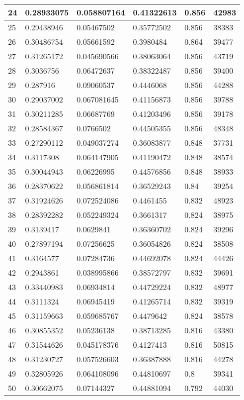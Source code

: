 \begin{longtable}{|l|l|l|l|l|l|}
24 & 0.28933075 & 0.058807164 & 0.41322613 & 0.856 & 42983 \\ \hline 
25 & 0.29438946 & 0.05467502 & 0.35772502 & 0.856 & 38383 \\ \hline 
26 & 0.30486754 & 0.05661592 & 0.3980484 & 0.864 & 39477 \\ \hline 
27 & 0.31265172 & 0.045690566 & 0.38063064 & 0.856 & 43719 \\ \hline 
28 & 0.3036756 & 0.06472637 & 0.38322487 & 0.856 & 39400 \\ \hline 
29 & 0.287916 & 0.09060537 & 0.4446068 & 0.856 & 44288 \\ \hline 
30 & 0.29037002 & 0.067081645 & 0.41156873 & 0.856 & 39788 \\ \hline 
31 & 0.30211285 & 0.06687769 & 0.41203496 & 0.856 & 39178 \\ \hline 
32 & 0.28584367 & 0.0766502 & 0.44505355 & 0.856 & 48348 \\ \hline 
33 & 0.27290112 & 0.049037274 & 0.36083877 & 0.848 & 37731 \\ \hline 
34 & 0.3117308 & 0.064147905 & 0.41190472 & 0.848 & 38574 \\ \hline 
35 & 0.30044943 & 0.06226995 & 0.44576856 & 0.848 & 38933 \\ \hline 
36 & 0.28370622 & 0.056861814 & 0.36529243 & 0.84 & 39254 \\ \hline 
37 & 0.31924626 & 0.072524086 & 0.4461455 & 0.832 & 48923 \\ \hline 
38 & 0.28392282 & 0.052249324 & 0.3661317 & 0.824 & 38975 \\ \hline 
39 & 0.3139417 & 0.0629841 & 0.36360702 & 0.824 & 39296 \\ \hline 
40 & 0.27897194 & 0.07256625 & 0.36054826 & 0.824 & 38508 \\ \hline 
41 & 0.3164577 & 0.07284736 & 0.44692078 & 0.824 & 44426 \\ \hline 
42 & 0.2943861 & 0.038995866 & 0.38572797 & 0.832 & 39691 \\ \hline 
43 & 0.33440983 & 0.06934814 & 0.44729224 & 0.832 & 48977 \\ \hline 
44 & 0.3111324 & 0.06945419 & 0.41265714 & 0.832 & 39319 \\ \hline 
45 & 0.31159663 & 0.059685767 & 0.4479642 & 0.824 & 38578 \\ \hline 
46 & 0.30855352 & 0.05236138 & 0.38713285 & 0.816 & 43380 \\ \hline 
47 & 0.31544626 & 0.045178376 & 0.4127413 & 0.816 & 50815 \\ \hline 
48 & 0.31230727 & 0.057526603 & 0.36387888 & 0.816 & 44278 \\ \hline 
49 & 0.32805926 & 0.064108096 & 0.44810697 & 0.8 & 39341 \\ \hline 
50 & 0.30662075 & 0.07144327 & 0.44881094 & 0.792 & 44030 \\ \hline 
\end{longtable}